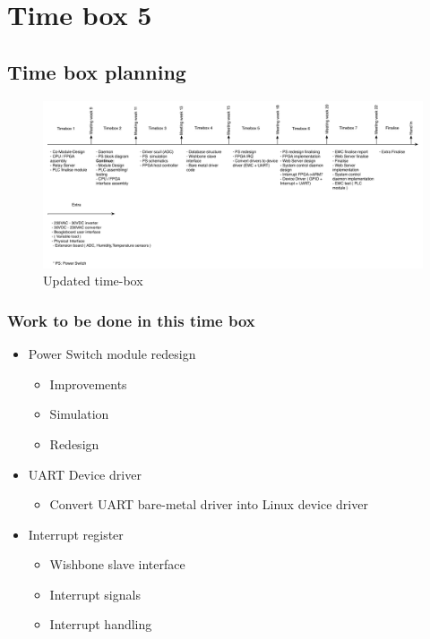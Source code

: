 \section{Time box 5} 
\subsection{Time box planning}
\begin{figure}[H]
	\begin{centering}
		\includegraphics[width=1.0\textwidth]{images/tb_r5.png}
		\caption{Updated time-box}
	\end{centering}
\end{figure}
\subsubsection{Work to be done in this time box}
\begin{itemize}
	\item Power Switch module redesign
	\begin{itemize}
		\item Improvements
		\item Simulation
		\item Redesign
	\end{itemize}
	\item UART Device driver
		\begin{itemize}
			\item Convert UART bare-metal driver into Linux device driver
		\end{itemize}
	\item Interrupt register
	\begin{itemize}
		\item Wishbone slave interface
		\item Interrupt signals
		\item Interrupt handling
	\end{itemize}
\end{itemize}
